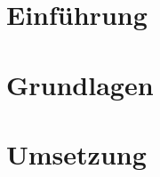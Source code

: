 \documentclass[fontsize=11pt,
		 oneside,
		 ngerman,
		 titlepage,
		 paper=a4,
		 bibliography=totoc,
		 listof=totoc,
		 DIV=10,
		 BCOR=5mm,
		 headsepline,
		 footsepline,
		 ]{scrartcl}
\begin{document}

\cleardoublepage





\tableofcontents
\clearpage

\section{Einführung}
\label{sec:Einführung}



\clearpage

\section{Grundlagen}
\label{sec:Grundlagen}

\clearpage

\clearpage

\clearpage

\clearpage

\section{Umsetzung}
\label{sec:Umsetzung}

\clearpage

\clearpage




\listoffigures
\clearpage
\lstlistoflistings
\clearpage
%

\renewcommand{\refname}{Quellenverzeichnis}



\clearpage





\mbox{}
\end{document}
